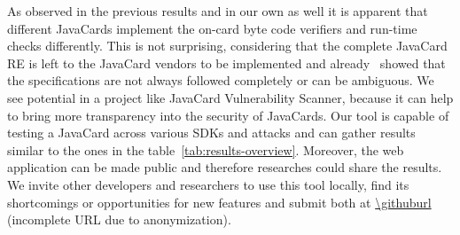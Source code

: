 \documentclass{../llncs/llncs}
\begin{document}
        As observed in the previous results and in our own as well it is apparent that different JavaCards implement the on-card byte code verifiers and run-time checks differently. This is not surprising, considering that the complete JavaCard RE is left to the JavaCard vendors to be implemented and already~\cite{Mostowski07testingthe} showed that the specifications are not always followed completely or can be ambiguous.
        We see potential in a project like JavaCard Vulnerability Scanner, because it can help to bring more transparency into the security of JavaCards. Our tool is capable of testing a JavaCard across various SDKs and attacks and can gather results similar to the ones in the table~\ref{tab:results-overview}. Moreover, the web application can be made public and therefore researches could share the results. We invite other developers and researchers to use this tool locally, find its shortcomings or opportunities for new features and submit both at \url{\githuburl} (incomplete URL due to anonymization). 

\end{document}
